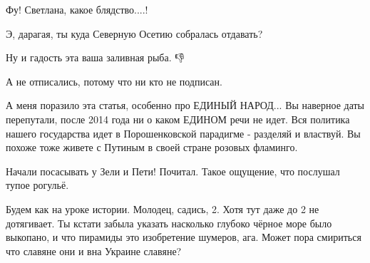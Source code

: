 \begin{itemize}
Фу! Светлана, какое блядство....!

 
Э, дарагая, ты куда Северную Осетию собралась отдавать?

 
Ну и гадость эта ваша заливная рыба. 👎

 
А не отписались, потому что ни кто не подписан.

 

А меня поразило эта статья, особенно про ЕДИНЫЙ НАРОД... Вы наверное даты
перепутали, после 2014 года ни о каком ЕДИНОМ речи не идет. Вся политика нашего
государства идет в Порошенковской парадигме - разделяй и властвуй. Вы похоже
тоже живете с Путиным в своей стране розовых фламинго.

 
Начали посасывать у Зели и Пети! Почитал. Такое ощущение, что послушал тупое рогульё.

 

Будем как на уроке истории. Молодец, садись, 2. Хотя тут даже до 2 не
дотягивает. Ты кстати забыла указать насколько глубоко чёрное море было
выкопано, и что пирамиды это изобретение шумеров, ага. Может пора смириться что
славяне они и вна Украине славяне?


\end{itemize}
